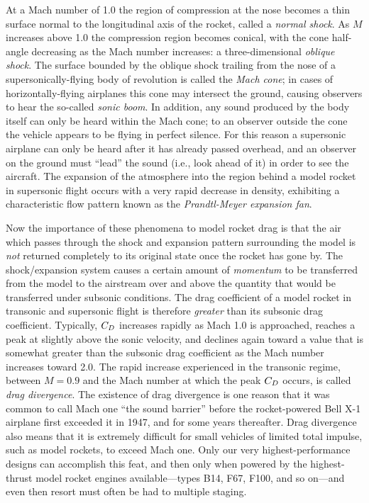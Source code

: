At a Mach number of 1.0 the region of compression at the
nose becomes a thin surface normal to the longitudinal axis
of the rocket, called a \emph{normal shock}. As $M$ increases above 1.0
the compression region becomes conical, with the cone half-angle
decreasing as the Mach number increases: a three-dimensional
\emph{oblique shock}. The surface bounded by the oblique shock trailing
from the nose of a supersonically-flying body of revolution is
called the \emph{Mach cone}; in cases of horizontally-flying airplanes
this cone may intersect the ground, causing observers to hear
the so-called \emph{sonic boom}. In addition, any sound produced by
the body itself can only be heard within the Mach cone; to an
observer outside the cone the vehicle appears to be flying in
perfect silence. For this reason a supersonic airplane can
only be heard after it has already passed overhead, and an
observer on the ground must ``lead'' the sound (i.e., look ahead
of it) in order to see the aircraft. The expansion of the
atmosphere into the region behind a model rocket in supersonic
flight occurs with a very rapid decrease in density, exhibiting
a characteristic flow pattern known as the \emph{Prandtl-Meyer expansion
fan}.

Now the importance of these phenomena to model rocket drag
is that the air which passes through the shock and expansion
pattern surrounding the model is \emph{not} returned completely to
its original state once the rocket has gone by. The shock/expansion
system causes a certain amount of \emph{momentum} to be transferred
from the model to the airstream over and above the quantity
that would be transferred under subsonic conditions. The drag
coefficient of a model rocket in transonic and supersonic flight
is therefore \emph{greater} than its subsonic drag coefficient.
Typically, $C_{D}$ increases rapidly as Mach 1.0 is approached,
reaches a peak at slightly above the sonic velocity, and declines
again toward a value that is somewhat greater than the subsonic
drag coefficient as the Mach number increases toward 2.0. The
rapid increase experienced in the transonic regime, between
$M = 0.9$ and the Mach number at which the peak $C_{D}$ occurs, is
called \emph{drag divergence}. The existence of drag divergence is
one reason that it was common to call Mach one ``the sound barrier''
before the rocket-powered Bell X-1 airplane first exceeded it
in 1947, and for some years thereafter. Drag divergence also
means that it is extremely difficult for small vehicles of
limited total impulse, such as model rockets, to exceed Mach
one. Only our very highest-performance designs can accomplish
this feat, and then only when powered by the highest-thrust
model rocket engines available---types B14, F67, F100, and
so on---and even then resort must often be had to multiple
staging.

